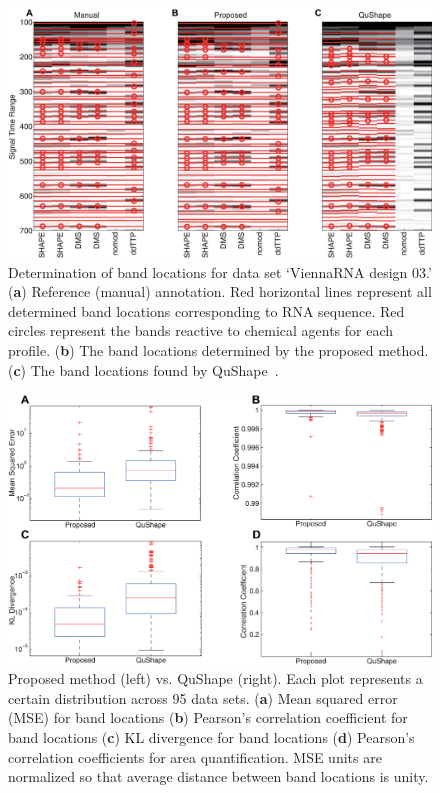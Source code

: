 \begin{figure}
\centering
\includegraphics[width=0.9\linewidth]{figures/result_band_assign6}
\caption{Determination of band locations for data set `ViennaRNA design 03.' (\textbf{a}) Reference (manual) annotation. Red horizontal lines represent all determined band locations corresponding to RNA sequence. Red circles represent the bands reactive to chemical agents for each profile. (\textbf{b}) The band locations determined by the proposed method. (\textbf{c}) The band locations found by QuShape~\citep{Karabiber2013}.}
\label{f:band-assign}
\end{figure}

\begin{figure}
\centering
\includegraphics[width=0.9\linewidth]{figures/boxplots}
\caption{Proposed method (left) vs. QuShape (right). Each plot represents a certain distribution across 95 data sets. (\textbf{a}) Mean squared error (MSE) for band locations (\textbf{b}) Pearson's correlation coefficient for band locations (\textbf{c}) KL divergence for band locations (\textbf{d}) Pearson's correlation coefficients for area quantification. MSE units are normalized so that average distance between band locations is unity.}
\label{f:boxplots}
\end{figure}


